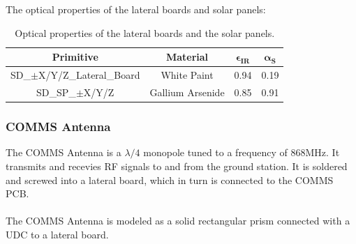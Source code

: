 The optical properties of the lateral boards and solar panels:

\begin{table}[H]
  \centering
  \begin{tabular}{@{}cccc@{}}
  \toprule
  \textbf{Primitive}             & \textbf{Material} & $\mathbf{\epsilon_{IR}}$ & $\mathbf{\alpha_{S}}$ \\ \midrule
  SD\_$\pm$X/Y/Z\_Lateral\_Board & White Paint       & 0.94                     & 0.19                  \\
  SD\_SP\_$\pm$X/Y/Z             & Gallium Arsenide  & 0.85                     & 0.91                  \\ \bottomrule
  \end{tabular}
  \caption{Optical properties of the lateral boards and the solar panels.}
\end{table}

\subsubsection{COMMS Antenna}
The COMMS Antenna is a $\lambda/4$ monopole tuned to a frequency of 868MHz. It transmits and recevies RF signals
to and from the ground station. It is soldered and screwed into a lateral board, which in turn is connected to the 
COMMS PCB.

\paragraph{}

The COMMS Antenna is modeled as a solid rectangular prism connected with a UDC to a lateral board.

